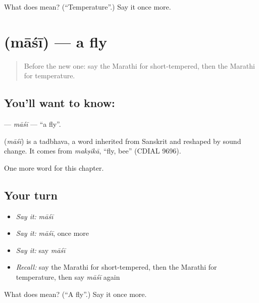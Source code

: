 \begin{tcolorbox}[breakable,colback=teal!4,colframe=teal!35!black,title={Before you move on}]
What does  mean? (\textquotedblleft{}Temperature\textquotedblright{}.) Say it once more.
\end{tcolorbox}
\section[\texorpdfstring{\mr{माशी} (māśī)}{माशी (māśī)}]{ (māśī) — a fly}

\label{lesson:MR-C262-masi}



\begin{quote}
Before the new one: say the Marathi for short-tempered, then the Marathi for temperature.
\end{quote}

\subsection*{You'll want to know: }
\textbf{} — \emph{māśī} — \textquotedblleft{}a fly\textquotedblright{}.

\begin{cousinweb}
\textbf{} (\emph{māśī}) is a tadbhava, a word inherited from Sanskrit and reshaped by sound change. It comes from \emph{makṣikā}, \textquotedblleft{}fly, bee\textquotedblright{} (CDIAL 9696).
\end{cousinweb}

\begin{grammarlens}[title={What you've built}]
One more word for this chapter.
\end{grammarlens}

\subsection*{Your turn}
\begin{itemize}
\raggedright
  \item \emph{Say it:} \emph{māśī}
  \item \emph{Say it:} \emph{māśī}, once more
  \item \emph{Say it:} say \emph{māśī}
  \item \emph{Recall:} say the Marathi for short-tempered, then the Marathi for temperature, then say \emph{māśī} again
\end{itemize}

\begin{tcolorbox}[breakable,colback=teal!4,colframe=teal!35!black,title={Before you move on}]
What does  mean? (\textquotedblleft{}A fly\textquotedblright{}.) Say it once more.
\end{tcolorbox}
